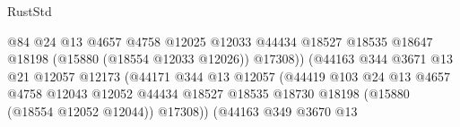 \begin{lexlean}{RustStd}
\begin{coremodule}
                                                    @84
                                                    @24
                                                    @13
                                                    @4657
                                                    @4758
                                                    @12025
                                                    @12033
                                                    @44434
                                                    @18527
                                                    @18535
                                                    @18647
                                                    @18198
                                                    (@15880 (@18554 @12033 @12026))
                                                    @17308))
                                                (@44163
                                                  @344
                                                  @3671
                                                  @13
                                                  @21
                                                  @12057
                                                  @12173
                                                  (@44171
                                                    @344
                                                    @13
                                                    @12057
                                                    (@44419
                                                      @103
                                                      @24
                                                      @13
                                                      @4657
                                                      @4758
                                                      @12043
                                                      @12052
                                                      @44434
                                                      @18527
                                                      @18535
                                                      @18730
                                                      @18198
                                                      (@15880 (@18554 @12052 @12044))
                                                      @17308))
                                                  (@44163
                                                    @349
                                                    @3670
                                                    @13

\end{coremodule}
\end{lexlean}
